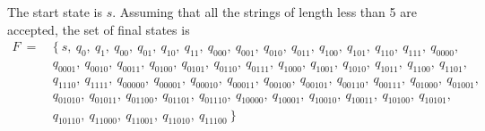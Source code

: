 \documentclass{article}
\begin{document}
    \quad The start state is $s$. Assuming that all the strings of length less than 5 are accepted, the set of final states is 
    \begin{equation}
    \begin{aligned}
    F~  = ~&\{\  s,~  q_{0},~  q_{1},~  q_{00},~  q_{01},~  q_{10},~
      q_{11},~  q_{000},~  q_{001},~  q_{010},~  q_{011},~  q_{100},~  q_{101},~  q_{110},~  q_{111},~  q_{0000},~ \\
      & q_{0001},~  q_{0010},~  q_{0011},~  q_{0100},~  q_{0101},~q_{0110},~  q_{0111},~  q_{1000},~  q_{1001},~  q_{1010},~  q_{1011},~  q_{1100},~  q_{1101},~ \\
      &  q_{1110},~  q_{1111},~  q_{00000},~  q_{00001},~  q_{00010},~  q_{00011},~q_{00100},~  q_{00101},~  q_{00110},~  q_{00111},~  q_{01000},~  q_{01001},~ \\
      & q_{01010},~  q_{01011},~   q_{01100},~  q_{01101},~  q_{01110},~  q_{10000},~  q_{10001},~q_{10010},~  q_{10011},~  q_{10100},~  q_{10101},~\\
      &  q_{10110},~  q_{11000},~  q_{11001},~ q_{11010},~  q_{11100}\ \} \nonumber
    \end{aligned}
    \end{equation}
    
\end{document}
